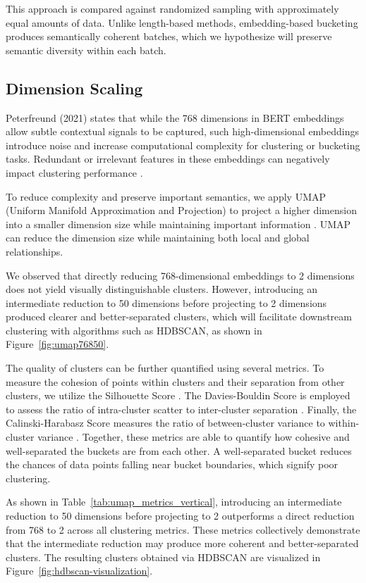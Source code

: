 \documentclass[twocolumn]{article}
\newcounter{ex}
\renewcommand{\indent}{\hspace*{2em}}
\begin{document}
\indent This approach is compared against randomized sampling with approximately equal amounts of data. Unlike length-based methods, embedding-based bucketing produces semantically coherent batches, which we hypothesize will preserve semantic diversity within each batch.

\subsection{Dimension Scaling}\label{scaling}

\indent Peterfreund (2021) states that while the 768 dimensions in BERT embeddings allow subtle contextual signals to be captured, such high-dimensional embeddings introduce noise and increase computational complexity for clustering or bucketing tasks. Redundant or irrelevant features in these embeddings can negatively impact clustering performance \cite{peterfreund2021multidimensional}.

\indent To reduce complexity and preserve important semantics, we apply UMAP (Uniform Manifold Approximation and Projection) to project a higher dimension into a smaller dimension size while maintaining important information \cite{mcinnes2018umap}. UMAP can reduce the dimension size while maintaining both local and global relationships.

\indent We observed that directly reducing 768-dimensional embeddings to 2 dimensions does not yield visually distinguishable clusters. However, introducing an intermediate reduction to 50 dimensions before projecting to 2 dimensions produced clearer and better-separated clusters, which will facilitate downstream clustering with algorithms such as HDBSCAN, as shown in Figure~\ref{fig:umap76850}.

\indent The quality of clusters can be further quantified using several metrics. To measure the cohesion of points within clusters and their separation from other clusters, we utilize the Silhouette Score \cite{ROUSSEEUW198753}. The Davies-Bouldin Score is employed to assess the ratio of intra-cluster scatter to inter-cluster separation \cite{davies1979cluster}. Finally, the Calinski-Harabasz Score measures the ratio of between-cluster variance to within-cluster variance \cite{calinski1974dendrite}. Together, these metrics are able to quantify how cohesive and well-separated the buckets are from each other. A well-separated bucket reduces the chances of data points falling near bucket boundaries, which signify poor clustering. 

\indent As shown in Table~\ref{tab:umap_metrics_vertical}, introducing an intermediate reduction to 50 dimensions before projecting to 2 outperforms a direct reduction from 768 to 2 across all clustering metrics. These metrics collectively demonstrate that the intermediate reduction may produce more coherent and better-separated clusters. The resulting clusters obtained via HDBSCAN are visualized in Figure~\ref{fig:hdbscan-visualization}.
\end{document}
